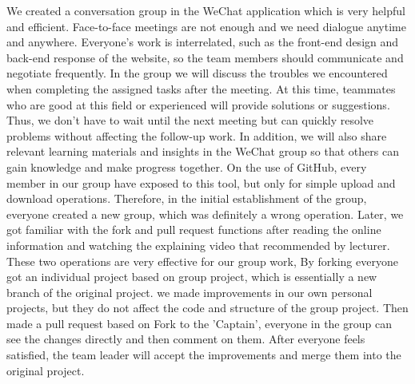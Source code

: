  
\vspace{0.3cm}


\noindent We created a conversation group in the WeChat application which is very helpful and efficient. Face-to-face meetings are not enough and we need dialogue anytime and anywhere. Everyone's work is interrelated, such as the front-end design and back-end response of the website, so the team members should communicate and negotiate frequently. In the group we will discuss the troubles we encountered when completing the assigned tasks after the meeting. At this time, teammates who are good at this field or experienced will provide solutions or suggestions. Thus, we don't have to wait until the next meeting but can quickly resolve problems without affecting the follow-up work. In addition, we will also share relevant learning materials and insights in the WeChat group so that others can gain knowledge and make progress together.
On the use of GitHub, every member in our group have exposed to this tool, but only for simple upload and download operations. Therefore, in the initial establishment of the group, everyone created a new group, which was definitely a wrong operation. Later, we got familiar with the fork and pull request functions after reading the online information and watching the explaining video that recommended by lecturer. These two operations are very effective for our group work, By forking everyone got an individual project based on group project, which is essentially a new branch of the original project. we made improvements in our own personal projects, but they do not affect the code and structure of the group project. Then made a pull request based on Fork to the 'Captain', everyone in the group can see the changes directly and then comment on them. After everyone feels satisfied, the team leader will accept the improvements and merge them into the original project.
\vspace{0.3cm}

